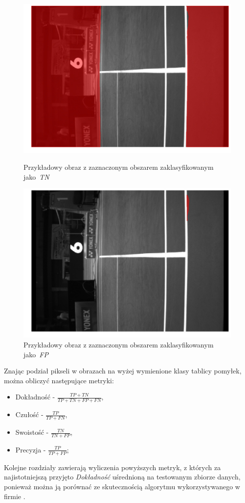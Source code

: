 \begin{figure}[!htb]
    \includegraphics[width=\linewidth]{TN_frame_8.jpg}
    \caption{Przykładowy obraz z zaznaczonym obszarem zaklasyfikowanym jako~\textit{TN}}
    \label{fig:TN}
  \endminipage\hfill
    \includegraphics[width=\linewidth]{FP_frame_8.jpg}
    \caption{Przykładowy obraz z zaznaczonym obszarem zaklasyfikowanym jako~\textit{FP}}
    \label{fig:FP}
  \endminipage\hfill
\end{figure}

Znając podział pikseli w obrazach na wyżej wymienione klasy tablicy pomyłek, można obliczyć następujące metryki:

\begin{itemize}
  \label{sec:miary}
  \item Dokładność - $ \frac{TP + TN}{TP + TN + FP + FN} $,
  \item Czułość - $ \frac{TP}{TP + FN} $,
  \item Swoistość - $ \frac{TN}{TN + FP} $,
  \item Precyzja - $ \frac{TP}{TP + FP} $;
\end{itemize}

Kolejne rozdziały zawierają wyliczenia powyższych metryk, z których za najistotniejszą przyjęto \textit{Dokładność} uśrednioną na testowanym zbiorze danych, ponieważ można ją porównać ze skutecznością algorytmu wykorzystywanego w firmie \blue{}.

